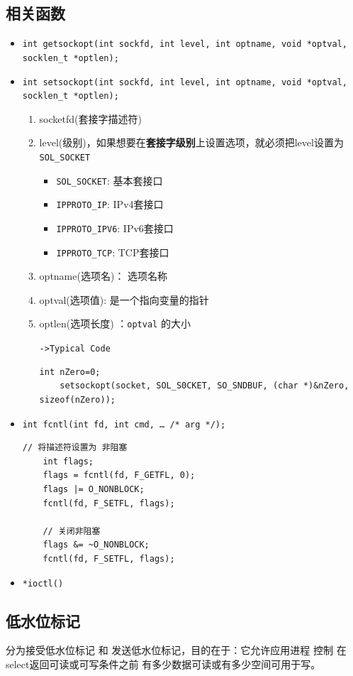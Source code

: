 \documentclass[UTF8,a4paper,12pt]{ctexbook}
\begin{document}
		\subsection{相关函数}
			\begin{itemize}
				\item \verb|int getsockopt(int sockfd, int level, int optname, void *optval, socklen_t *optlen);|
				\item \verb|int setsockopt(int sockfd, int level, int optname, void *optval, socklen_t *optlen);|
					\begin{enumerate}
						\item socketfd(套接字描述符)
						\item level(级别)，如果想要在\textbf{套接字级别}上设置选项，就必须把level设置为\verb|SOL_SOCKET|
							\begin{itemize}
								\item \verb|SOL_SOCKET|: 基本套接口
								\item \verb|IPPROTO_IP|: IPv4套接口
								\item \verb|IPPROTO_IPV6|: IPv6套接口
								\item \verb|IPPROTO_TCP|: TCP套接口
							\end{itemize}
						\item optname(选项名)： 选项名称
						\item optval(选项值): 是一个指向变量的指针 
						\item optlen(选项长度) ：\verb|optval| 的大小
						
							\verb|->Typical Code|
							\begin{lstlisting}[frame=L]
	int nZero=0;
	setsockopt(socket, SOL_S0CKET, SO_SNDBUF, (char *)&nZero, sizeof(nZero));
							\end{lstlisting}
					\end{enumerate}
				\item \verb|int fcntl(int fd, int cmd, … /* arg */);|
					\begin{lstlisting}[frame=L]
	// 将描述符设置为 非阻塞
	int flags;
	flags = fcntl(fd, F_GETFL, 0);
	flags |= O_NONBLOCK;
	fcntl(fd, F_SETFL, flags);
	
	// 关闭非阻塞
	flags &= ~O_NONBLOCK;
	fcntl(fd, F_SETFL, flags);	
					\end{lstlisting}
				\item \verb|*ioctl()|
			\end{itemize}
		\subsection{低水位标记}
			分为接受低水位标记 和 发送低水位标记，目的在于：它允许应用进程 控制 在select返回可读或可写条件之前 有多少数据可读或有多少空间可用于写。
			
\end{document}
